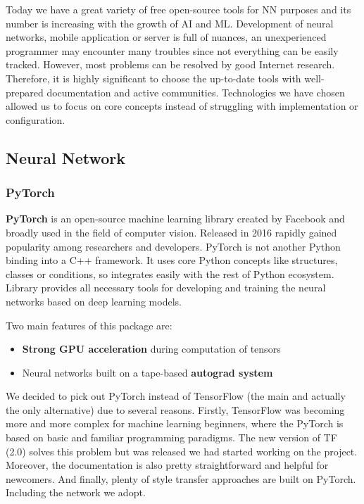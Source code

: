 \documentclass[../Main.tex]{subfiles}
\begin{document}
Today we have a great variety of free open-source tools for NN purposes and its
number is increasing with the growth of AI and ML. Development of neural networks,
mobile application or server is full of nuances, an unexperienced programmer may 
encounter many troubles since not everything can be easily tracked. However, most
problems can be resolved by good Internet research. Therefore, it is highly significant
to choose the up-to-date tools with well-prepared documentation and active communities. 
Technologies we have chosen allowed us to focus on core concepts instead of 
struggling with implementation or configuration.

\subsection{Neural Network}

    \subsubsection{PyTorch}
        \textbf{PyTorch} is an open-source machine learning library created by Facebook and broadly used in the field of computer vision. Released in 2016 rapidly gained popularity among researchers and developers. PyTorch is not another Python binding into a C++ framework. It uses core Python concepts like structures, classes or conditions, so integrates easily with the rest of Python ecosystem. Library provides all necessary tools for developing and training the neural networks based on deep learning models.
        
        Two main features of this package are:
        \begin{itemize}
            \item \textbf{Strong GPU acceleration} during computation of tensors
            \item Neural networks built on a tape-based \textbf{autograd system}
        \end{itemize}
        
        We decided to pick out PyTorch instead of TensorFlow (the main and actually the only alternative) due to several reasons. Firstly, TensorFlow was becoming more and more complex for machine learning beginners, where the PyTorch is based on basic and familiar programming paradigms. The new version of TF (2.0) solves this problem but was released  we had started working on the project. Moreover, the documentation is also pretty straightforward and helpful for newcomers. And finally, plenty of style transfer approaches are built on PyTorch. Including the network we adopt. 
\end{document}
